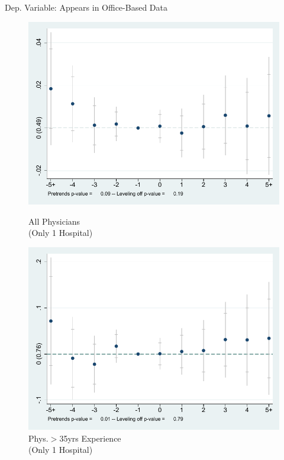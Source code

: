 \documentclass[10pt]{beamer}
\begin{document}
\begin{frame}{Dep. Variable: Appears in Office-Based Data}
\begin{figure}[ht]
        \begin{minipage}[b]{0.47\linewidth}
            \centering
            \includegraphics[width=\textwidth]{Objects/xtevent_hosp_fullsample_office.pdf}
            \caption{\small All Physicians \\(Only 1 Hospital)}
        \end{minipage}
        \hspace{0.2cm}
        \begin{minipage}[b]{0.47\linewidth}
            \centering
            \includegraphics[width=\textwidth]{Objects/xtevent_hosp_oldsample_office.pdf}
            \caption{\small Phys.$>$35yrs Experience\\ (Only 1 Hospital)}
        \end{minipage}
    \end{figure}
\end{frame}
\end{document}
